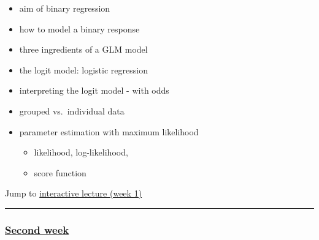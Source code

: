 \documentclass[
]{article}
\providecommand{\tightlist}{%
  \setlength{\itemsep}{0pt}\setlength{\parskip}{0pt}}
\begin{document}
\begin{itemize}
\tightlist
\item
  aim of binary regression
\item
  how to model a binary response
\item
  three ingredients of a GLM model
\item
  the logit model: logistic regression
\item
  interpreting the logit model - with odds
\item
  grouped vs.~individual data
\item
  parameter estimation with maximum likelihood

  \begin{itemize}
  \tightlist
  \item
    likelihood, log-likelihood,
  \item
    score function
  \end{itemize}
\end{itemize}

Jump to \protect\hyperlink{ILw1}{interactive lecture (week 1)}

\begin{center}\rule{0.5\linewidth}{0.5pt}\end{center}

\hypertarget{second-week}{%
\subsubsection{\texorpdfstring{\protect\hyperlink{secondweek}{Second
week}}{Second week}}\label{second-week}}
\end{document}
